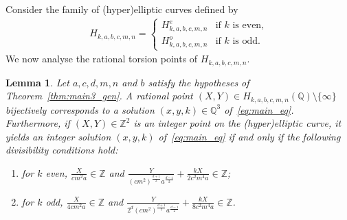 \documentclass[11pt,a4paper]{amsart}
\newcommand{\ZZ}{\mathbb{Z}}
\newcommand{\Q}{\mathbb{Q}}
\theoremstyle{plain}
\newtheorem{lemma}[theorem]{Lemma}
\theoremstyle{definition}
\begin{document}
Consider the family of (hyper)elliptic curves defined by
\begin{align}\label{Hyperelliptic}
H_{k,a,b,c,m,n} = 
\begin{cases} 
H_{k,a,b,c,m,n}^e & \text{if } k \text{ is even,} \\ 
H_{k,a,b,c,m,n}^o & \text{if } k \text{ is odd.} 
\end{cases}
\end{align}
We now analyse the rational torsion points of $H_{k,a,b,c,m,n}$.
\begin{lemma} \label{lem:inverse-mapping}
Let $a, c, d, m, n$ and $b$ satisfy the hypotheses of Theorem~\ref{thm:main3_gen}. A rational point $(X, Y) \in H_{k,a,b,c,m,n}(\Q)\setminus\{\infty\}$ bijectively corresponds to a solution $(x, y, k) \in \Q^3$ of~\eqref{eq:main_eq}. Furthermore, if $(X, Y) \in \ZZ^2$ is an integer point on the (hyper)elliptic curve, it yields an integer solution $(x, y, k)$ of~\eqref{eq:main_eq} if and only if the following divisibility conditions hold:
\begin{enumerate}[label=(\alph*)]
    \item for $k$ even, $\frac{X}{cm^2a}\in \ZZ$ and $\frac{Y}{(cm^2)^{\frac{d+1}{2}}a^{\frac{d-1}{2}}} + \frac{kX}{2c^2m^4a}\in \ZZ$;\label{Ccond:a}
    \item for $k$ odd, $\frac{X}{4cm^2a}\in \ZZ$ and $\frac{Y}{2^d(cm^2)^{\frac{d+1}{2}}a^{\frac{d-1}{2}}} + \frac{kX}{8c^2m^4a}\in \ZZ$.\label{Ccond:b}
\end{enumerate}
\end{lemma}
\end{document}
